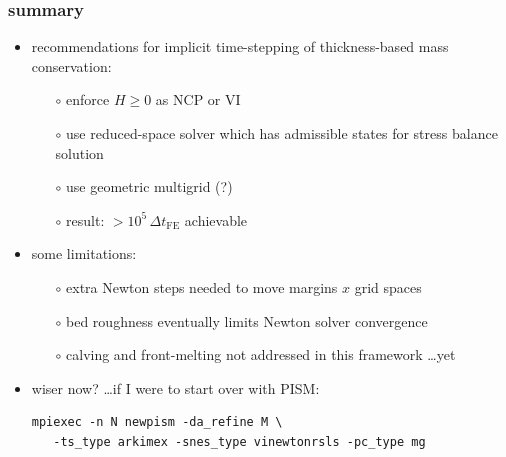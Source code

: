 \documentclass[hide notes,intlimits,usenames,dvipsnames]{beamer}
\begin{document}
\begin{frame}[fragile]
\frametitle{summary}
\begin{itemize}
\item recommendations for implicit time-stepping of thickness-based mass conservation:
  \begin{itemize}
  \item[$\circ$] enforce $H\ge 0$ as NCP or VI
  \item[$\circ$] use reduced-space solver which has admissible states for stress balance solution
  \item[$\circ$] use geometric multigrid (?)
  \item[$\circ$] result: $>10^5 \,\Delta t_{\text{FE}}$ achievable
  \end{itemize}
\item some limitations:
  \begin{itemize}
  \item[$\circ$] extra Newton steps needed to move margins $x$ grid spaces
  \item[$\circ$] bed roughness eventually limits Newton solver convergence
  \item[$\circ$] calving and front-melting not addressed in this framework \dots yet
  \end{itemize}

\bigskip
\item wiser now? \dots if I were to start over with PISM:
\scriptsize
\begin{verbatim}
mpiexec -n N newpism -da_refine M \
   -ts_type arkimex -snes_type vinewtonrsls -pc_type mg
\end{verbatim}
\end{itemize}
\end{frame}
\end{document}

